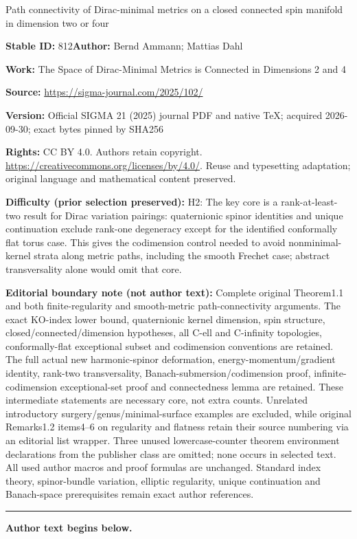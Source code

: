 \documentclass[11pt]{article}
\numberwithin{equation}{section}
\newcommand\<{\langle}
\renewcommand\>{\rangle}
\theoremstyle{definition}
\newcommand\={\,=\,}
\numberwithin{equation}{section}
\begin{document}
\begin{center}\Large Path connectivity of Dirac-minimal metrics on a closed connected spin manifold in dimension two or four\end{center}
\noindent\textbf{Stable ID:} 812\quad\textbf{Author:} Bernd Ammann; Mattias Dahl\par
\noindent\textbf{Work:} The Space of Dirac-Minimal Metrics is Connected in Dimensions 2 and 4\par
\noindent\textbf{Source:} \url{https://sigma-journal.com/2025/102/}\par
\noindent\textbf{Version:} Official SIGMA 21 (2025) journal PDF and native TeX; acquired 2026-09-30; exact bytes pinned by SHA256\par
\noindent\textbf{Rights:} CC BY 4.0. Authors retain copyright. \url{https://creativecommons.org/licenses/by/4.0/}. Reuse and typesetting adaptation; original language and mathematical content preserved.\par
\noindent\textbf{Difficulty (prior selection preserved):} {\CJKfont H2: The key core is a rank-at-least-two result for Dirac variation pairings: quaternionic spinor identities and unique continuation exclude rank-one degeneracy except for the identified conformally flat torus case. This gives the codimension control needed to avoid nonminimal-kernel strata along metric paths, including the smooth Frechet case; abstract transversality alone would omit that core.}\par
\medskip\noindent\textbf{Editorial boundary note (not author text):} Complete original Theorem1.1 and both finite-regularity and smooth-metric path-connectivity arguments. The exact KO-index lower bound, quaternionic kernel dimension, spin structure, closed/connected/dimension hypotheses, all C-ell and C-infinity topologies, conformally-flat exceptional subset and codimension conventions are retained. The full actual new harmonic-spinor deformation, energy-momentum/gradient identity, rank-two transversality, Banach-submersion/codimension proof, infinite-codimension exceptional-set proof and connectedness lemma are retained. These intermediate statements are necessary core, not extra counts. Unrelated introductory surgery/genus/minimal-surface examples are excluded, while original Remarks1.2 items4–6 on regularity and flatness retain their source numbering via an editorial list wrapper. Three unused lowercase-counter theorem environment declarations from the publisher class are omitted; none occurs in selected text. All used author macros and proof formulas are unchanged. Standard index theory, spinor-bundle variation, elliptic regularity, unique continuation and Banach-space prerequisites remain exact author references.\par
\medskip\hrule\medskip\noindent\textbf{Author text begins below.}\par
\setcounter{section}{0}
\end{document}
